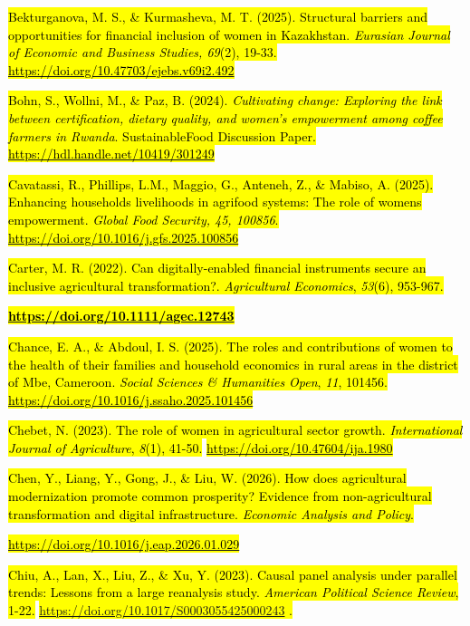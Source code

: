 \hl{Bekturganova, M. S., \& Kurmasheva, M. T. (2025). Structural
barriers and opportunities for financial inclusion of women in
Kazakhstan. \emph{Eurasian Journal of Economic and Business Studies,
69}(2), 19-33.}
\href{https://doi.org/10.47703/ejebs.v69i2.492}{\hl{https://doi.org/10.47703/ejebs.v69i2.492}}

\hl{Bohn, S., Wollni, M., \& Paz, B. (2024). \emph{Cultivating change:
Exploring the link between certification, dietary quality, and women's
empowerment among coffee farmers in Rwanda}. SustainableFood Discussion
Paper.}
\href{https://hdl.handle.net/10419/301249}{\hl{https://hdl.handle.net/10419/301249}}

\hl{Cavatassi, R., Phillips, L.M., Maggio, G., Anteneh, Z., \& Mabiso,
A. (2025). Enhancing households\textquotesingle{} livelihoods in
agrifood systems: The role of women\textquotesingle s empowerment.
\emph{Global Food Security, 45, 100856}.}
\href{https://doi.org/10.1016/j.gfs.2025.100856}{\hl{https://doi.org/10.1016/j.gfs.2025.100856}}

\hl{Carter, M. R. (2022). Can digitally-enabled financial instruments
secure an inclusive agricultural transformation?. \emph{Agricultural
Economics}, \emph{53}(6), 953-967.}

\href{https://doi.org/10.1111/agec.12743}{\textbf{\hl{https://doi.org/10.1111/agec.12743}}}

\hl{Chance, E. A., \& Abdoul, I. S. (2025). The roles and contributions
of women to the health of their families and household economics in
rural areas in the district of Mbe, Cameroon. \emph{Social Sciences \&
Humanities Open}, \emph{11}, 101456.}
\href{https://doi.org/10.1016/j.ssaho.2025.101456}{\hl{https://doi.org/10.1016/j.ssaho.2025.101456}}

\hl{Chebet, N. (2023). The role of women in agricultural sector growth.
\emph{International Journal of Agriculture}, \emph{8}(1), 41-50.}
\href{https://doi.org/10.47604/ija.1980}{\hl{https://doi.org/10.47604/ija.1980}}

\hl{Chen, Y., Liang, Y., Gong, J., \& Liu, W. (2026). How does
agricultural modernization promote common prosperity? Evidence from
non-agricultural transformation and digital infrastructure.
\emph{Economic Analysis and Policy}.}

\href{https://doi.org/10.1016/j.eap.2026.01.029}{\hl{https://doi.org/10.1016/j.eap.2026.01.029}}

\hl{Chiu, A., Lan, X., Liu, Z., \& Xu, Y. (2023). Causal panel analysis
under parallel trends: Lessons from a large reanalysis study.
\emph{American Political Science Review}, 1-22.}
\hl{\mbox{\url{https://doi.org/10.1017/S0003055425000243}} .}


